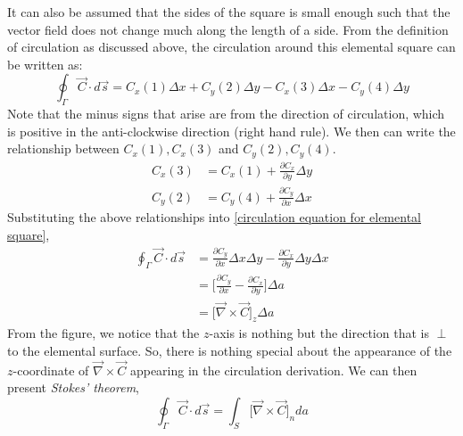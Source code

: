 It can also be assumed that the sides of the square is small enough such that the vector field does not change much along the length of a side. From the definition of circulation as discussed above, the circulation around this elemental square can be written as: 
\begin{equation}
	\label{circulation equation for elemental square}
	\oint_{\Gamma} \vec{C} \cdot d\vec{s} = C_{x}(1)\Delta x + C_{y}(2)\Delta y - C_{x}(3) \Delta x - C_{y}(4) \Delta y
\end{equation}
Note that the minus signs that arise are from the direction of circulation, which is positive in the anti-clockwise direction (right hand rule). We then can write the relationship between $C_{x}(1), C_{x}(3)$ and $C_{y}(2),C_{y}(4)$. 
\begin{align} 
	C_{x}(3) &= C_{x}(1) + \frac{\partial C_{x}}{\partial y}\Delta y\\
	C_{y}(2) &= C_{y}(4) + \frac{\partial C_{y}}{\partial x}\Delta x
\end{align}
Substituting the above relationships into \autoref{circulation equation for elemental square}, 
\begin{align}
	\oint_{\Gamma} \vec{C} \cdot d\vec{s} &= \frac{\partial C_{y}}{\partial x}\Delta x\Delta y - \frac{\partial C_{x}}{\partial y}\Delta y \Delta x\\
	&= \Big[ \frac{\partial C_{y}}{\partial x} - \frac{\partial C_{x}}{\partial y} \Big]\Delta a\\
	&= \Big[ \vec{\nabla} \times \vec{C} \Big]_{z}\Delta a
\end{align}
From the figure, we notice that the $z$-axis is nothing but the direction that is $\perp$ to the elemental surface. So, there is nothing special about the appearance of the $z$-coordinate of $\vec{\nabla} \times \vec{C}$ appearing in the circulation derivation. We can then present \emph{Stokes' theorem}, 
\begin{equation}
	\oint_{\Gamma} \vec{C} \cdot d\vec{s} = \int_{S} \Big[ \vec{\nabla} \times \vec{C} \Big]_{n}da
\end{equation}
















































